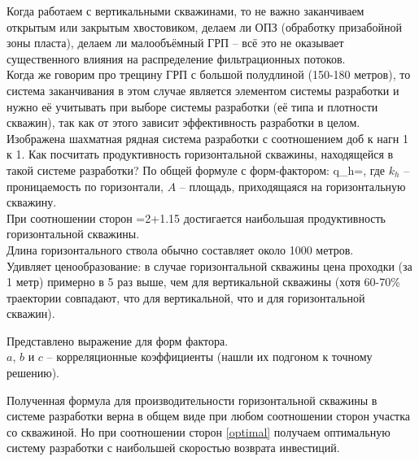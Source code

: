 \documentclass[main.tex]{subfiles}
\begin{document}
Когда работаем с вертикальными скважинами, то не важно заканчиваем открытым или закрытым хвостовиком, делаем ли ОПЗ (обработку призабойной зоны пласта), делаем ли малообъёмный ГРП -- всё это не оказывает существенного влияния на распределение фильтрационных потоков.\\

Когда же говорим про трещину ГРП с большой полудлиной (150-180 метров), то система заканчивания в этом случае является элементом системы разработки и нужно её учитывать при выборе системы разработки (её типа и плотности скважин), так как от этого зависит эффективность разработки в целом.\\

Изображена шахматная рядная система разработки с соотношением доб к нагн 1 к 1. Как посчитать продуктивность горизонтальной скважины, находящейся в такой системе разработки? По общей формуле с форм-фактором:
\beq
q_h=,
\eeq
где $k_h$ -- проницаемость по горизонтали, $A$ -- площадь, приходящаяся на горизонтальную скважину.\\

При соотношении сторон
\beq\label{optimal}
=2+1.15\cdot{}
\eeq
достигается наибольшая продуктивность горизонтальной скважины.\\

Длина горизонтального ствола обычно составляет около 1000 метров.\\

Удивляет ценообразование: в случае горизонтальной скважины цена проходки (за 1 метр) примерно в 5 раз выше, чем для вертикальной скважины (хотя 60-70\% траектории совпадают, что для вертикальной, что и для горизонтальной скважин).


Представлено выражение для форм фактора.\\

$a$, $b$ и $c$ -- корреляционные коэффициенты (нашли их подгоном к точному решению).

Полученная формула для производительности горизонтальной скважины в системе разработки верна в общем виде при любом соотношении сторон участка со скважиной. Но при соотношении сторон \eqref{optimal} получаем оптимальную систему разработки с наибольшей скоростью возврата инвестиций.

\end{document}
